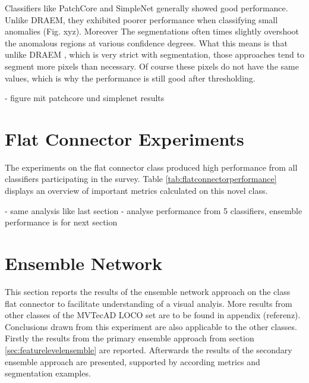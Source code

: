 

Classifiers like PatchCore \cite{patchCore2022} and SimpleNet \cite{liu2023simplenet} generally showed good performance. Unlike DRAEM, they exhibited 
poorer performance when classifying small anomalies (Fig. xyz). Moreover The segmentations often times slightly overshoot the anomalous regions at various confidence 
degrees. What this means is that unlike DRAEM \cite{Zavrtanik_2021DRAEM}, which is very strict with segmentation, those approaches tend to segment more pixels than necessary. 
Of course these pixels do not have the same values, which is why the performance is still good after thresholding. 

- figure mit patchcore und simplenet results



\section{Flat Connector Experiments}
\label{sec:faltconnectorxperiments}

The experiments on the flat connector class produced high performance from all classifiers participating in the survey. Table \ref{tab:flatconnectorperformance} 
displays an overview of important metrics calculated on this novel class.




- same analysis like last section\newline
- analyse performance from 5 classifiers, ensemble performance is for next section


\section{Ensemble Network}
\label{sec:ensembleresults}

This section reports the results of the ensemble network approach on the class flat connector to facilitate understanding of a visual 
analyis. More results from other classes of the MVTecAD LOCO \cite{LOCODentsAndScratchesBergmann2022} set are to be found in appendix (referenz). Conclusions drawn from this 
experiment are also applicable to the other classes. Firstly the results from the primary ensemble approach from section \ref{sec:featurelevelensemble} are reported. Afterwards 
the results of the secondary ensemble approach are presented, supported by according metrics and segmentation examples.


